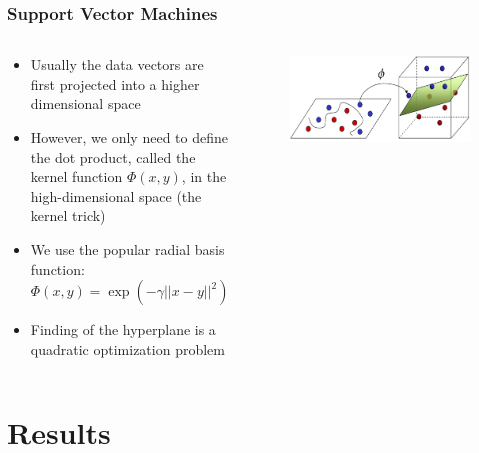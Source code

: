 \documentclass[hyperref={pdfpagelabels=false}]{beamer}
\begin{document}
\frame
{
  \frametitle{Support Vector Machines}

\begin{columns}
\begin{column}{7cm}
{\small
  \begin{itemize}
    \item Usually the data vectors are first projected into a higher dimensional space
    \item However, we only need to define the dot product, called the kernel function $\Phi(x,y)$, in the high-dimensional space (the kernel trick)
    \item We use the popular radial basis function: $\Phi(x,y) = \exp(-\gamma||x-y||^2)$
    \item Finding of the hyperplane is a quadratic optimization problem
  \end{itemize}
}
\end{column}
\begin{column}{4.5cm}
\begin{figure}
	\centering
		\includegraphics[width=\textwidth]{svm2.png}
	\label{fig:bridge}
\end{figure}
\end{column}
\end{columns}
}


\section{Results}
\end{document}
